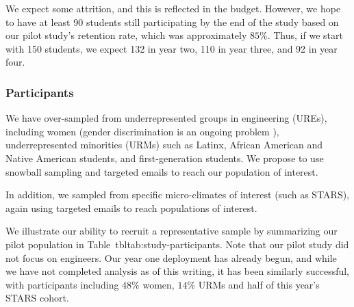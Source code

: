 We expect some attrition, and this is reflected in the budget. However, we hope to have at least 90 students still participating by the end of the study based on our pilot study's retention rate, which was approximately $85\%$. Thus, if we start with 150 students, we expect 132 in year two, 110 in year three, and 92 in year four. 


\subsubsection{Participants}
\label{sec:study-participants}
We have over-sampled from underrepresented groups in engineering (UREs), including women (gender discrimination is an ongoing problem \cite{johnson2018sexual}), underrepresented minorities (URMs) such as Latinx, African American and Native American students, and first-generation students.  We propose to use snowball sampling and targeted emails to reach our population of interest. 

In addition, we sampled from specific micro-climates of interest (such as STARS), again using targeted emails to reach populations of interest.

We illustrate our ability to recruit a representative sample by summarizing our pilot population in Table~tbl{tab:study-participants}. Note that our pilot study did not focus on engineers. Our year one deployment has already begun, and while we have not completed analysis as of this writing, it has been similarly successful, with participants including $48\%$ women, $14\%$ URMs and half of this year's STARS cohort.  

